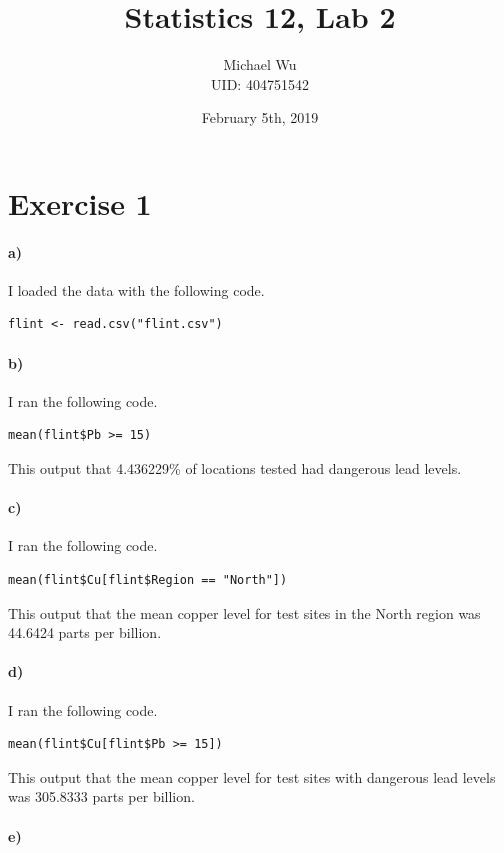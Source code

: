 \documentclass[12pt]{article}
\begin{document}
\title{Statistics 12, Lab 2}
\date{February 5th, 2019}
\author{Michael Wu\\UID: 404751542}
\maketitle

\section*{Exercise 1}

\paragraph{a)}

I loaded the data with the following code.
\begin{verbatim}
flint <- read.csv("flint.csv")
\end{verbatim}

\paragraph{b)}

I ran the following code.
\begin{verbatim}
mean(flint$Pb >= 15)
\end{verbatim}
This output that 4.436229\% of locations tested had dangerous lead levels.

\paragraph{c)}

I ran the following code.
\begin{verbatim}
mean(flint$Cu[flint$Region == "North"])
\end{verbatim}
This output that the mean copper level for test sites in the North region
was 44.6424 parts per billion.

\paragraph{d)}

I ran the following code.
\begin{verbatim}
mean(flint$Cu[flint$Pb >= 15])
\end{verbatim}
This output that the mean copper level for test sites with dangerous lead levels
was 305.8333 parts per billion.

\paragraph{e)}
\end{document}
